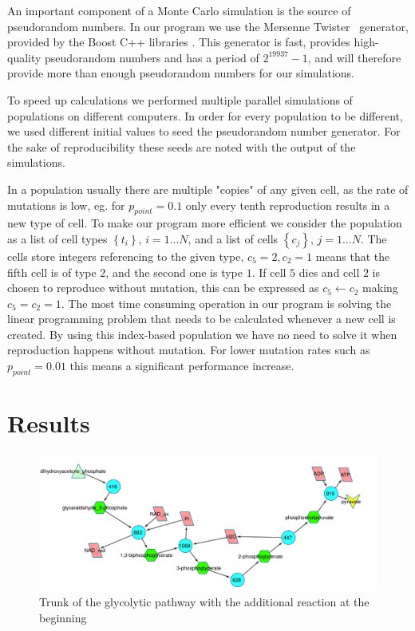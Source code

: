 \documentclass[a4paper,12pt]{article}
\begin{document}
	An important component of a Monte Carlo simulation is the source of pseudorandom numbers. In our program we use the Mersenne Twister \cite{mersennetwister}~generator, provided by the Boost C++ libraries \cite{boostlibraries}. This generator is fast, provides high-quality pseudorandom numbers and has a period of $2^{19937}-1$, and will therefore provide more than enough pseudorandom numbers for our simulations.

	To speed up calculations we performed multiple parallel simulations of populations on different computers. In order for every population to be different, we used different initial values to seed the pseudorandom number generator. For the sake of reproducibility these seeds are noted with the output of the simulations. 

In a population usually there are multiple "copies" of any given cell, as the rate of mutations is low, eg. for $p_{point}=0.1$ only every tenth reproduction results in a new type of cell. To make our program more efficient we consider the population as a list of cell types $ \left\{ t_i \right\}$, $i=1...N$, and a list of cells $\left\{ c_j \right\}$, $j=1...N$. The cells store integers referencing to the given type, $c_5=2, c_2=1$ means that the fifth cell is of type $2$, and the second one is type $1$. If cell $5$ dies and cell $2$ is chosen to reproduce without mutation, this can be expressed as $c_5 \leftarrow c_2$ making $c_5=c_2=1$. The most time consuming operation in our program is solving the linear programming problem that needs to be calculated whenever a new cell is created. By using this index-based population we have no need to solve it when reproduction happens without mutation. For lower mutation rates such as $p_{point}=0.01$ this means a significant performance increase. 

\section{Results}
\label{sec:results}

\begin{figure}[htpb]
	\centering
	\includegraphics[width=1\linewidth]{trunk_glyc_init_large.pdf}
	\caption{Trunk of the glycolytic pathway with the additional reaction at the beginning}
	\label{fig:truncglycinit}
\end{figure}
\end{document}
